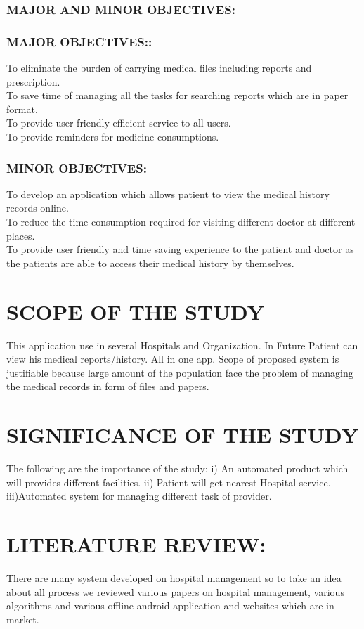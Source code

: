 \documentclass[12pt,]{article}
\begin{document}
\subsubsection{MAJOR AND MINOR OBJECTIVES:}
\subsubsection{MAJOR OBJECTIVES::}
 To eliminate the burden of carrying medical files including reports and prescription.\\To save time of managing all the tasks for searching reports which are in paper format.\\ To provide user friendly efficient service to all users.\\ To provide reminders for medicine consumptions. 
\subsubsection{MINOR OBJECTIVES:}
To develop an application which  allows patient to view the medical history records online.\\ To reduce the time consumption required for visiting different doctor at different places.\\ To provide user friendly and time saving experience to the patient and doctor as the patients  are able to access their medical history by themselves.
\section{SCOPE OF THE STUDY}
This application use in several Hospitals and Organization. In Future Patient can view his medical reports/history. All in one app. Scope of proposed system is justifiable because large amount of the population face the problem of managing the medical records in form of files and papers.\cite{maloney2007tool}
\section{SIGNIFICANCE OF THE STUDY}
The following are the importance of the study:
i) An automated product which will provides different facilities. 
ii) Patient will get nearest Hospital service.
iii)Automated system for managing different task of provider.
\section{LITERATURE REVIEW:}
There are many system developed on hospital management so to take an idea about all process we reviewed various papers on hospital management, various algorithms and various offline android application and websites which are in market.
\end{document}
